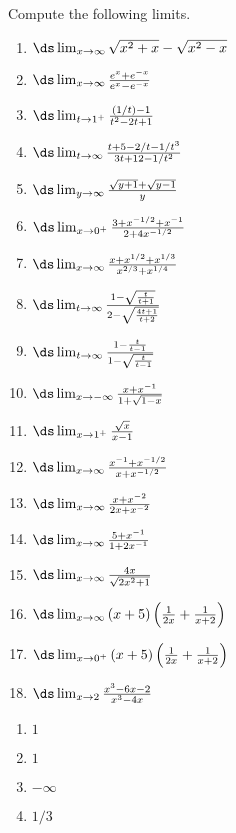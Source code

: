 \begin{enumialphparenastyle}

\begin{ex}
Compute the following limits.
\begin{multicols}{3}
\begin{enumerate}
	\item	$\ds\lim_{x\to \infty} \sqrt{x^2+x}-\sqrt{x^2-x}$
	\item	$\ds\lim_{x\to\infty} {e^x + e^{-x}\over e^x -e^{-x}}$
	\item	$\ds\lim_{t\to1^+}{(1/t)-1\over t^2-2t+1}$
	\item	$\ds\lim_{t\to\infty}{t+5-2/t-1/t^3\over 3t+12-1/t^2}$
	\item	$\ds\lim_{y\to\infty}{\sqrt{y+1}+\sqrt{y-1}\over y}$
	\item	$\ds\lim_{x\to 0^+}{3+x^{-1/2}+x^{-1}\over 2+4x^{-1/2}}$
	\item	$\ds\lim_{x\to\infty}{x+x^{1/2}+x^{1/3}\over x^{2/3}+x^{1/4}}$
	\item	$\ds\lim_{t\to\infty}{1-\sqrt{t\over t+1}\over 2-\sqrt{4t+1\over t+2}}$
	\item	$\ds\lim_{t\to\infty}{1-{t\over t-1}\over 1-\sqrt{t\over t-1}}$
	\item	$\ds\lim_{x\to-\infty}{x+x^{-1}\over 1+\sqrt{1-x}}$
	\item	$\ds\lim_{x\to1^+}{\sqrt{x}\over x-1}$
	\item	$\ds\lim_{x\to\infty}{x^{-1}+x^{-1/2}\over x+x^{-1/2}}$
	\item	$\ds\lim_{x\to\infty}{x+x^{-2}\over 2x+x^{-2}}$
	\item	$\ds\lim_{x\to\infty}{5+x^{-1}\over 1+2x^{-1}}$
	\item	$\ds\lim_{x\to\infty}{4x\over\sqrt{2x^2+1}}$
	\item	$\ds\lim_{x\to\infty}{(x+5)\left({1\over 2x}+{1\over x+2}\right)}$
	\item	$\ds\lim_{x\to0^+}{(x+5)\left({1\over 2x}+{1\over x+2}\right)}$
	\item	$\ds\lim_{x\to2}{x^3-6x-2\over x^3-4x}$
\end{enumerate}
\end{multicols}
\begin{sol}
\begin{multicols}{3}
\begin{enumerate}
	\item	$1$
	\item	$1$
	\item	$-\infty$
	\item	$1/3$

\end{enumerate}
\end{multicols}
\end{sol}
\end{ex}
\end{enumialphparenastyle}
